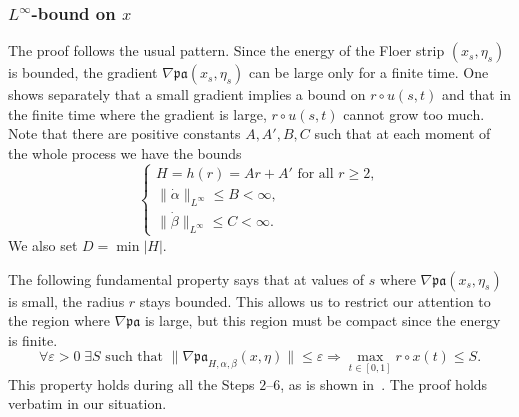 \documentclass{amsart}
\newcommand{\pacal}{\mathfrak{pa}}
\theoremstyle{definition}
\theoremstyle{remark}
\numberwithin{equation}{section}
\begin{document}
\subsubsection*{$L^\infty$-bound on $x$}
%

The proof follows the usual pattern. Since the energy of the Floer strip $(x_s,\eta_s)$ is bounded, the gradient $\nabla\pacal(x_s,\eta_s)$ can be large only for a finite time. One shows separately that a small gradient implies a bound on $r\circ u(s,t)$ and that in the finite time where the gradient is large, $r\circ u(s,t)$ cannot grow too much. Note that there are positive constants $A,A',B,C$ such that at each moment of the whole process we have the bounds
\begin{equation}\label{conditions}
\begin{cases}
	H=h(r)=Ar + A' \mbox{ for all }r\geq 2,\\
	\|\dot\alpha\|_{L^\infty}\leq B <\infty,\\
	\|\dot\beta\|_{L^\infty}\leq C <\infty.
\end{cases}
\end{equation}
We also set $D=\min|H|$.

The following fundamental property says that at values of $s$ where $\nabla\pacal(x_s,\eta_s)$ is small, the radius $r$ stays bounded. This allows us to restrict our attention to the region where $\nabla\pacal$ is large, but this region must be compact since the energy is finite. 
\begin{equation}
	\forall\varepsilon>0\;\exists S\mbox{ such that } \|\nabla \pacal_{H,\alpha,\beta}(x,\eta)\|\leq \varepsilon \Rightarrow \max_{t\in[0,1]} r\circ x(t)\leq S.
\label{fundamental}
\end{equation}
This property holds during all the Steps $2$--$6$, as is shown in~\cite[Lemma 4.7]{CFO10}. The proof holds verbatim in our situation. 
\end{document}
